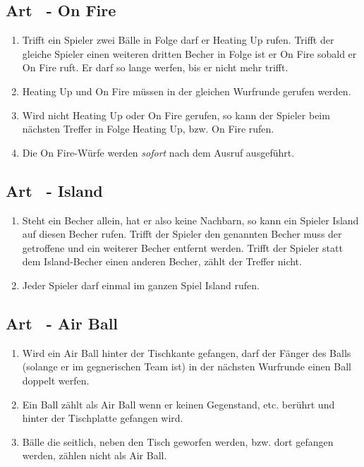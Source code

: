 \documentclass[a4paper,11pt]{scrartcl}
\newcommand{\enum}[1]{\begin{enumerate}[label=(\arabic*)]#1\end{enumerate}}
\newcommand{\art}[2]{\subsection*{#1} \enum{#2}}
\newcommand{\quot}[1]{\glqq #1\grqq}
\newcounter{art}
\begin{document}
\art{Art \theart\ - \quot{On Fire}}{
    \item
        Trifft ein Spieler zwei Bälle in Folge darf er \quot{Heating Up} rufen. Trifft der gleiche Spieler einen weiteren dritten Becher in Folge ist er \quot{On Fire} sobald er \quot{On Fire} ruft. Er darf so lange werfen, bis er nicht mehr trifft.
    \item
        \quot{Heating Up} und \quot{On Fire} müssen in der gleichen Wurfrunde gerufen werden.
    \item
        Wird nicht \quot{Heating Up} oder \quot{On Fire} gerufen, so kann der Spieler beim nächsten Treffer in Folge \quot{Heating Up}, bzw. \quot{On Fire} rufen.
    \item
        Die \quot{On Fire}-Würfe werden \emph{sofort} nach dem Ausruf ausgeführt.
}

\art{Art \theart\ - \quot{Island}}{
    \item
        Steht ein Becher allein, hat er also keine Nachbarn, so kann ein Spieler \quot{Island} auf diesen Becher rufen. Trifft der Spieler den genannten Becher muss der getroffene und ein weiterer Becher entfernt werden. Trifft der Spieler statt dem \quot{Island}-Becher einen anderen Becher, zählt der Treffer nicht.
    \item
        Jeder Spieler darf einmal im ganzen Spiel \quot{Island} rufen.
}

\art{Art \theart\ - \quot{Air Ball}}{
    \item
        Wird ein \quot{Air Ball} hinter der Tischkante gefangen, darf der Fänger des Balls (solange er im gegnerischen Team ist) in der nächsten Wurfrunde einen Ball doppelt werfen.
    \item
        Ein Ball zählt als \quot{Air Ball} wenn er keinen Gegenstand, etc. berührt und hinter der Tischplatte gefangen wird.
    \item
        Bälle die seitlich, neben den Tisch geworfen werden, bzw. dort gefangen werden, zählen nicht als \quot{Air Ball}.
}
\end{document}
